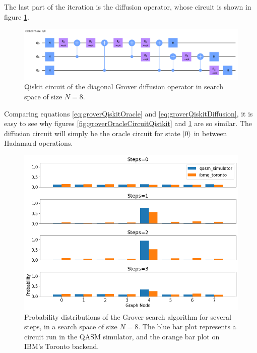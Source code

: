 \documentclass[../../dissertation.tex]{subfiles}
\begin{document}
The last part of the iteration is the diffusion operator, whose circuit is
shown in figure \ref{fig:groverDiffCircuitQistkit}.
\begin{figure}[!h]
	\centering
	\includegraphics[scale=0.25]{img/Qiskit/GroverQiskit/Circuits/GroverQiskitCircDiff_N3_M4_S3.png}
	\caption{Qiskit circuit of the  diagonal Grover diffusion operator in search space of size $N=8$.}
	\label{fig:groverDiffCircuitQistkit}
\end{figure}
Comparing equations \ref{eq:groverQiskitOracle} and
\ref{eq:groverQiskitDiffusion}, it is easy to see why figures
\ref{fig:groverOracleCircuitQistkit} and \ref{fig:groverDiffCircuitQistkit} are
so similar. The diffusion circuit will simply be the oracle circuit for state
$\ket{0}$ in between Hadamard operations.
\begin{figure}[!h]
	\centering
	\includegraphics[scale=0.40]{img/Qiskit/GroverQiskit/GroverQiskitSearch_N3_M4_S0123}
	\caption{Probability distributions of the Grover search algorithm for several steps, in a search space of size $N=8$. The blue bar plot represents a circuit run in the QASM simulator, and the orange bar plot on IBM's Toronto backend.}
	\label{fig:groverQiskitDist}
\end{figure}\par
\end{document}
